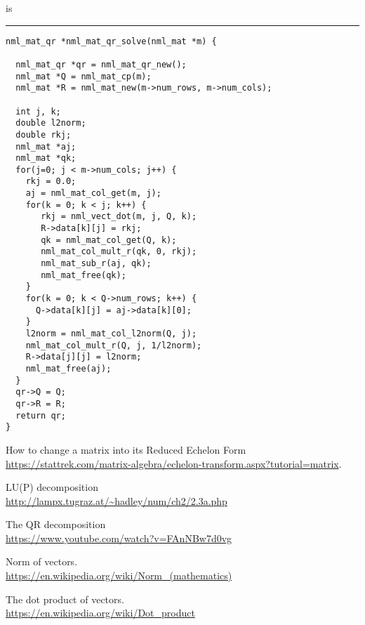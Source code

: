 is

\rule{\textwidth}{0.5pt}
\begin{verbatim}
nml_mat_qr *nml_mat_qr_solve(nml_mat *m) {

  nml_mat_qr *qr = nml_mat_qr_new();
  nml_mat *Q = nml_mat_cp(m);
  nml_mat *R = nml_mat_new(m->num_rows, m->num_cols);

  int j, k;
  double l2norm;
  double rkj;
  nml_mat *aj;
  nml_mat *qk;
  for(j=0; j < m->num_cols; j++) {    
    rkj = 0.0;
    aj = nml_mat_col_get(m, j);
    for(k = 0; k < j; k++) {
       rkj = nml_vect_dot(m, j, Q, k);
       R->data[k][j] = rkj;
       qk = nml_mat_col_get(Q, k);
       nml_mat_col_mult_r(qk, 0, rkj);
       nml_mat_sub_r(aj, qk);
       nml_mat_free(qk);
    }
    for(k = 0; k < Q->num_rows; k++) {
      Q->data[k][j] = aj->data[k][0];
    }
    l2norm = nml_mat_col_l2norm(Q, j);
    nml_mat_col_mult_r(Q, j, 1/l2norm);
    R->data[j][j] = l2norm;
    nml_mat_free(aj);
  }
  qr->Q = Q;
  qr->R = R;
  return qr;
} 
\end{verbatim}

\begin{thebibliography}{9}
How to change a matrix into its Reduced Echelon Form
\\ 
\url{https://stattrek.com/matrix-algebra/echelon-transform.aspx?tutorial=matrix}.

LU(P) decomposition
\\ 
\url{http://lampx.tugraz.at/~hadley/num/ch2/2.3a.php}

The QR decomposition
\\ 
\url{https://www.youtube.com/watch?v=FAnNBw7d0vg}

Norm of vectors.
\\ 
\url{https://en.wikipedia.org/wiki/Norm_(mathematics)}

The dot product of vectors.
\\ 
\url{https://en.wikipedia.org/wiki/Dot_product}
\end{thebibliography}

